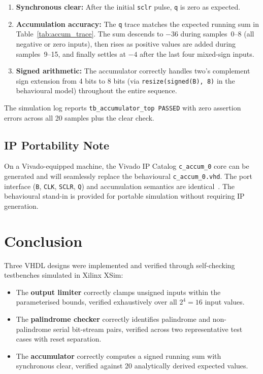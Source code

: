 \documentclass[12pt]{article}
\begin{document}
\begin{enumerate}[nosep]
  \item \textbf{Synchronous clear:} After the initial \texttt{sclr}
        pulse, \texttt{q} is zero as expected.
  \item \textbf{Accumulation accuracy:} The \texttt{q} trace matches
        the expected running sum in Table~\ref{tab:accum_trace}. The sum
        descends to $-36$ during samples~0--8 (all negative or zero
        inputs), then rises as positive values are added during
        samples~9--15, and finally settles at $-4$ after the last four
        mixed-sign inputs.
  \item \textbf{Signed arithmetic:} The accumulator correctly handles
        two's complement sign extension from 4 bits to 8 bits (via
        \texttt{resize(signed(B),\,8)} in the behavioural model)
        throughout the entire sequence.
\end{enumerate}

\noindent
The simulation log reports \texttt{tb\_accumulator\_top PASSED} with
zero assertion errors across all 20 samples plus the clear check.

\subsection{IP Portability Note}

On a Vivado-equipped machine, the Vivado IP Catalog \texttt{c\_accum\_0}
core can be generated and will seamlessly replace the behavioural
\texttt{c\_accum\_0.vhd}. The port interface (\texttt{B}, \texttt{CLK},
\texttt{SCLR}, \texttt{Q}) and accumulation semantics are
identical~\cite{pg119}. The behavioural stand-in is provided for
portable simulation without requiring IP generation.

\section{Conclusion}
\label{sec:conclusion}

Three VHDL designs were implemented and verified through self-checking
testbenches simulated in Xilinx XSim:

\begin{itemize}[nosep]
  \item The \textbf{output limiter} correctly clamps unsigned inputs
        within the parameterised bounds, verified exhaustively over all
        $2^4 = 16$ input values.
  \item The \textbf{palindrome checker} correctly identifies palindrome
        and non-palindrome serial bit-stream pairs, verified across two
        representative test cases with reset separation.
  \item The \textbf{accumulator} correctly computes a signed running sum
        with synchronous clear, verified against 20 analytically derived
        expected values.
\end{itemize}
\end{document}
